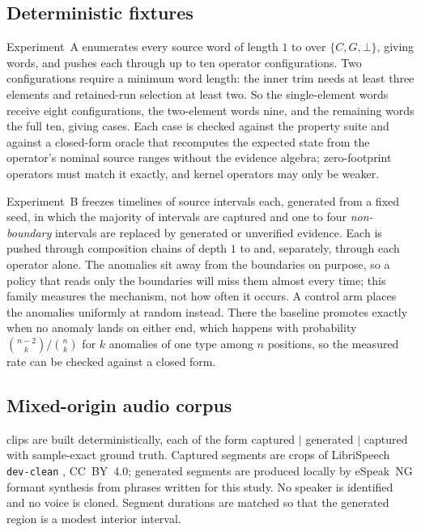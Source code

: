 \documentclass[preprint,3p,11pt,authoryear]{elsarticle}
\newcommand{\C}{\ensuremath{C}}
\newcommand{\G}{\ensuremath{G}}
\begin{document}
\subsection{Deterministic fixtures}

Experiment~A enumerates every source word of length $1$ to \Amaxlen{} over
$\{\C, \G, \bot\}$, giving \Awords{} words, and pushes each through up to ten
operator configurations. Two configurations require a minimum word length: the inner trim needs at least three elements and retained-run selection at least two. So the \AwordsShortOne{} single-element words receive eight configurations,
the \AwordsShortTwo{} two-element words nine, and the remaining \AwordsFull{}
words the full ten, giving \Acases{} cases. Each case is checked against the property suite and against a closed-form
oracle that recomputes the expected state from the operator's nominal source
ranges without the evidence algebra; zero-footprint operators must match it
exactly, and kernel operators may only be weaker.

Experiment~B freezes \Btimelines{} timelines of \Bintervals{} source intervals
each, generated from a fixed seed, in which the majority of intervals are
captured and one to four \emph{non-boundary} intervals are replaced by generated
or unverified evidence. Each is pushed through composition chains of depth $1$
to \Bdepths{} and, separately, through each operator alone. The anomalies sit away from the boundaries on purpose, so a policy that reads
only the boundaries will miss them almost every time; this family measures the
mechanism, not how often it occurs. A control arm places the anomalies uniformly
at random instead. There the baseline promotes exactly when no anomaly lands on
either end, which happens with probability $\binom{n-2}{k}/\binom{n}{k}$ for $k$
anomalies of one type among $n$ positions, so the measured rate can be checked
against a closed form.

\subsection{Mixed-origin audio corpus}
\label{sec:corpus}

\Cclips{} clips are built deterministically, each of the form captured $\vert$
generated $\vert$ captured with sample-exact ground truth. Captured segments are
crops of LibriSpeech \texttt{dev-clean} \citep{panayotov2015librispeech},
CC~BY~4.0; generated segments are produced locally by eSpeak~NG formant
synthesis from phrases written for this study. No speaker is identified and no
voice is cloned. Segment durations are matched so that the generated region is
a modest interior interval. 
\end{document}
